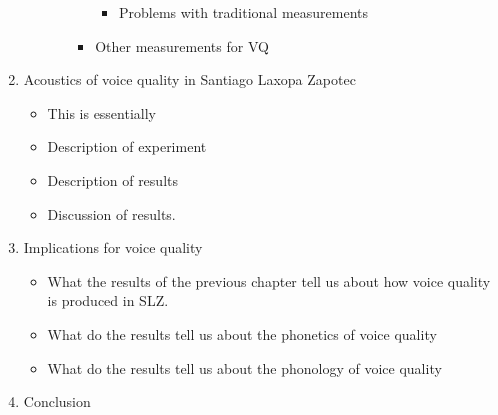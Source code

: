 \documentclass[12pt, letterpaper]{article}
\begin{document}
\begin{enumerate}
\begin{itemize}
\begin{itemize}
\begin{itemize}
\begin{itemize}
                    \item Problems with traditional measurements \citep{chaiH1H2Acoustic2022}
                \end{itemize}
                \item Other measurements for VQ \citep{garellekPhoneticsVoice2019, keatingCrosslanguageAcousticSpace2023}
            \end{itemize}
        \end{itemize}
    \end{itemize}
    \item Acoustics of voice quality in Santiago Laxopa Zapotec
    \begin{itemize}
        \item This is essentially \citet{brinkerhoffResidualH1MeasureInPreparation}
        \item Description of experiment
        \item Description of results
        \item Discussion of results.
    \end{itemize}
    \item Implications for voice quality
    \begin{itemize}
        \item What the results of the previous chapter tell us about how voice quality is produced in SLZ. 
        \item What do the results tell us about the phonetics of voice quality
        \item What do the results tell us about the phonology of voice quality
    \end{itemize}
    \item Conclusion
\end{enumerate}

\end{document}
